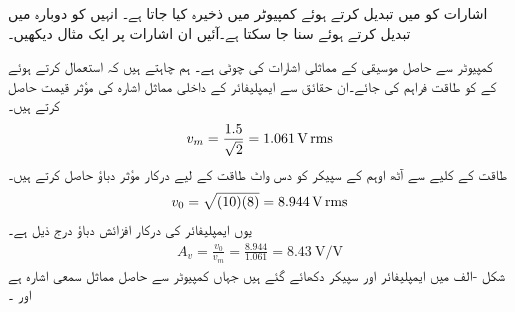  اشارات کو  میں تبدیل کرتے ہوئے کمپیوٹر میں ذخیرہ کیا جاتا ہے۔ انہیں کو دوبارہ  میں تبدیل کرتے ہوئے سنا جا سکتا ہے۔آئیں ان اشارات پر ایک مثال دیکھیں۔

کمپیوٹر سے حاصل موسیقی کے مماثلی اشارات کی چوٹی  ہے۔ ہم چاہتے ہیں کہ  استعمال کرتے ہوئے  کے  کو  طاقت فراہم کی جائے۔ان حقائق سے ایمپلیفائر کے داخلی مماثل اشارہ کی مؤثر قیمت حاصل کرتے ہیں۔
\begin{align*}
v_m=\frac{1.5}{\sqrt{2}}=\SI{1.061}{\volt}\,{\textup{rms}}
\end{align*}
طاقت کے کلیے  سے آٹھ اوہم کے سپیکر کو دس واٹ طاقت کے لیے درکار مؤثر دباؤ حاصل کرتے ہیں۔
\begin{align*}
v_0=\sqrt{(10)(8)}=\SI{8.944}{\volt}\,{\textup{rms}}
\end{align*} 
یوں ایمپلیفائر کی درکار افزائش دباؤ درج ذیل ہے۔
\begin{align*}
A_v=\frac{v_0}{v_m}=\frac{8.944}{1.061}=\SI{8.43}{\volt\per\volt}
\end{align*}
شکل -الف میں  ایمپلیفائر اور سپیکر دکھائے گئے ہیں جہاں  کمپیوٹر سے حاصل مماثل سمعی اشارہ ہے اور ۔
